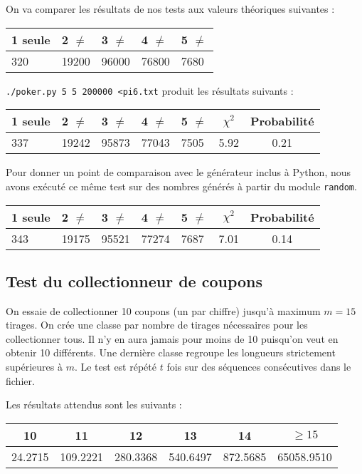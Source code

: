 \documentclass[12pt,a4paper]{article}
\begin{document}
On va comparer les résultats de nos tests aux valeurs théoriques suivantes :
\begin{center}
\begin{tabular}{l|l|l|l|l}
1 seule & 2 $\neq$ & 3 $\neq$ & 4 $\neq$ & 5 $\neq$ \\ \hline
320 & 19200 & 96000 & 76800 & 7680
\end{tabular}
\end{center}

\texttt{./poker.py 5 5 200000 <pi6.txt} produit les résultats suivants :
\begin{center}
\begin{tabular}{l|l|l|l|l|c|c}
1 seule & 2 $\neq$ & 3 $\neq$ & 4 $\neq$ & 5 $\neq$
	& $\chi^2$ & Probabilité \\ \hline
337 & 19242 & 95873 & 77043 & 7505 &  5.92 &  0.21
\end{tabular}
\end{center}

Pour donner un point de comparaison avec le générateur inclus à Python,
nous avons
exécuté ce même test sur des nombres générés à partir du module \texttt{random}.

\begin{center}
\begin{tabular}{l|l|l|l|l|c|c}
1 seule & 2 $\neq$ & 3 $\neq$ & 4 $\neq$ & 5 $\neq$
	& $\chi^2$ & Probabilité \\ \hline
343 & 19175 & 95521 & 77274 & 7687 &  7.01 &  0.14
\end{tabular}
\end{center}


\subsection{Test du collectionneur de coupons}
On essaie de collectionner 10 coupons (un par chiffre)
jusqu'à maximum $m=15$ tirages.
On crée une classe par nombre de tirages nécessaires pour les collectionner tous.
Il n'y en aura jamais pour moins de 10 puisqu'on veut en obtenir 10 différents.
Une dernière classe regroupe les longueurs strictement supérieures à $m$.
Le test est répété $t$ fois sur des séquences consécutives dans le fichier.

Les résultats attendus sont les suivants :
\begin{center}
\begin{tabular}{c|c|c|c|c|c}
10 & 11 & 12 & 13 & 14 & $\geq 15$ \\ \hline
24.2715 & 109.2221 & 280.3368 & 540.6497 & 872.5685 & 65058.9510
\end{tabular}
\end{center}
\end{document}
